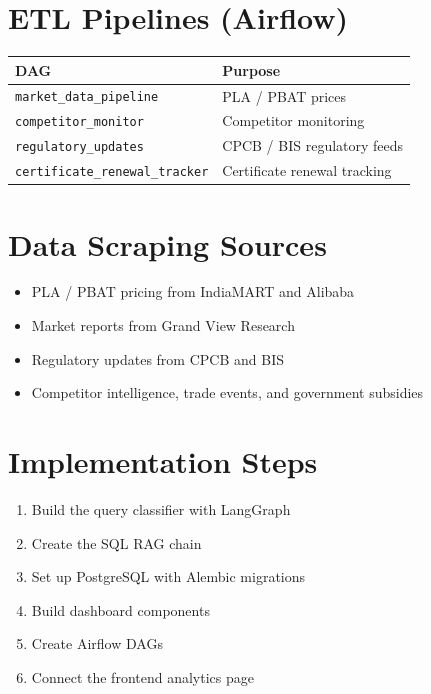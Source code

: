 \documentclass{article}
\begin{document}
\section{ETL Pipelines (Airflow)}

\begin{center}
\begin{tabular}{@{}ll@{}}
\toprule
\textbf{DAG} & \textbf{Purpose} \\
\midrule
\texttt{market\_data\_pipeline} & PLA / PBAT prices \\
\texttt{competitor\_monitor} & Competitor monitoring \\
\texttt{regulatory\_updates} & CPCB / BIS regulatory feeds \\
\texttt{certificate\_renewal\_tracker} & Certificate renewal tracking \\
\bottomrule
\end{tabular}
\end{center}

\section{Data Scraping Sources}

\begin{itemize}[leftmargin=*]
  \item PLA / PBAT pricing from IndiaMART and Alibaba
  \item Market reports from Grand View Research
  \item Regulatory updates from CPCB and BIS
  \item Competitor intelligence, trade events, and government subsidies
\end{itemize}

\section{Implementation Steps}

\begin{enumerate}[leftmargin=*]
  \item Build the query classifier with LangGraph
  \item Create the SQL RAG chain
  \item Set up PostgreSQL with Alembic migrations
  \item Build dashboard components
  \item Create Airflow DAGs
  \item Connect the frontend analytics page
\end{enumerate}
\end{document}

